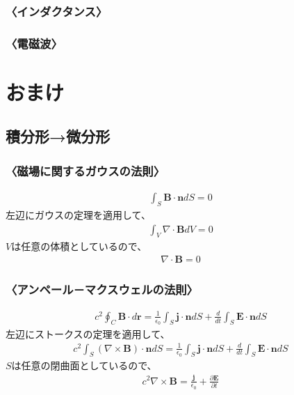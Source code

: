 \documentclass[10pt,b5paper,papersize,dvipdfmx]{jsbook}
\begin{document}
\subsubsection{〈インダクタンス〉}


\subsubsection{〈電磁波〉}


\section{おまけ}
\subsection{積分形→微分形}
\subsubsection{〈磁場に関するガウスの法則〉}
\begin{align}
\int_S \mathbf{B}\cdot \mathbf{n}dS = 0
\end{align}
左辺にガウスの定理を適用して、
\begin{align}
\int_V \nabla\cdot\mathbf{B}dV = 0
\end{align}
$V$は任意の体積としているので、
\begin{align}
\nabla\cdot\mathbf{B}=0
\end{align}

\subsubsection{〈アンペール－マクスウェルの法則〉}
\begin{align}
c^2 \oint_C \mathbf{B}\cdot d\mathbf{r} = \frac{1}{\epsilon_0}\int_S \mathbf{j}\cdot \mathbf{n}dS + \frac{d}{dt}\int_S \mathbf{E}\cdot \mathbf{n}dS
\end{align}
左辺にストークスの定理を適用して、
\begin{align}
c^2 \int_S (\nabla\times\mathbf{B})\cdot\mathbf{n}dS = \frac{1}{\epsilon_0}\int_S \mathbf{j}\cdot \mathbf{n}dS + \frac{d}{dt}\int_S \mathbf{E}\cdot \mathbf{n}dS
\end{align}
$S$は任意の閉曲面としているので、
\begin{align}
c^2 \nabla\times\mathbf{B} = \frac{\mathbf{j}}{\epsilon_0} + \frac{\partial\mathbf{E}}{\partial t}
\end{align}
\end{document}
